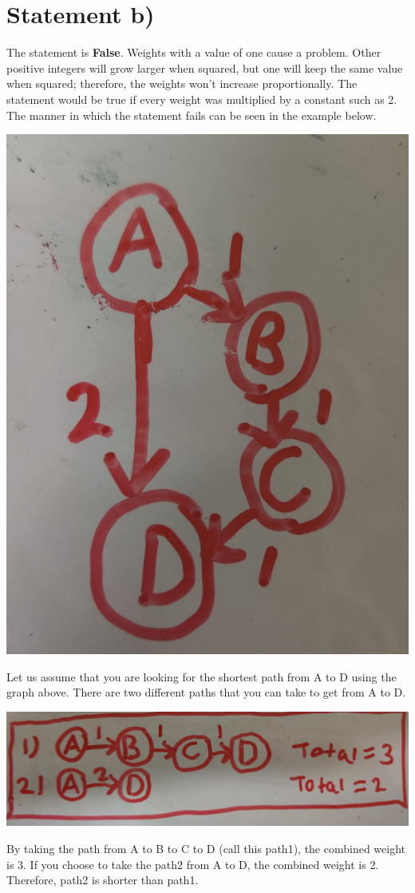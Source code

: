 \documentclass[11pt]{article}
\begin{document}
\newpage
\section{Statement b)}
The statement is \textbf{False}. Weights with a value of one cause a problem. Other positive integers will grow larger when squared, but one will keep the same value when squared; therefore, the weights won't increase proportionally. The statement would be true if every weight was multiplied by a constant such as 2. The manner in which the statement fails can be seen in the example below. 

\begin{center}
\includegraphics[keepaspectratio=true,scale=0.25]{graph2.jpg}
\end{center}
Let us assume that you are looking for the shortest path from A to D using the graph above. There are two different paths that you can take to get from A to D.

\begin{center}
\includegraphics[keepaspectratio=true,scale=0.25]{original_paths2.jpg}
\end{center}
By taking the path from A to B to C to D (call this path1), the combined weight is 3. If you choose to take the path2 from A to D, the combined weight is 2. Therefore, path2 is shorter than path1.
\end{document}

